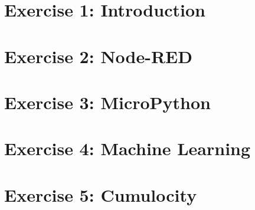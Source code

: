 




\renewcommand{\familydefault}{cmss}






\tableofcontents
\newpage
\listoffigures
\listoftables
\newpage

\printacronyms[heading=chapter*]
\newpage


\chapter{Exercise 1: Introduction}


\chapter{Exercise 2: Node-RED}


\chapter{Exercise 3: MicroPython}


\chapter{Exercise 4: Machine Learning}


\chapter{Exercise 5: Cumulocity}


{} 

\renewcommand{\bibname}{References}

\printbibliography


